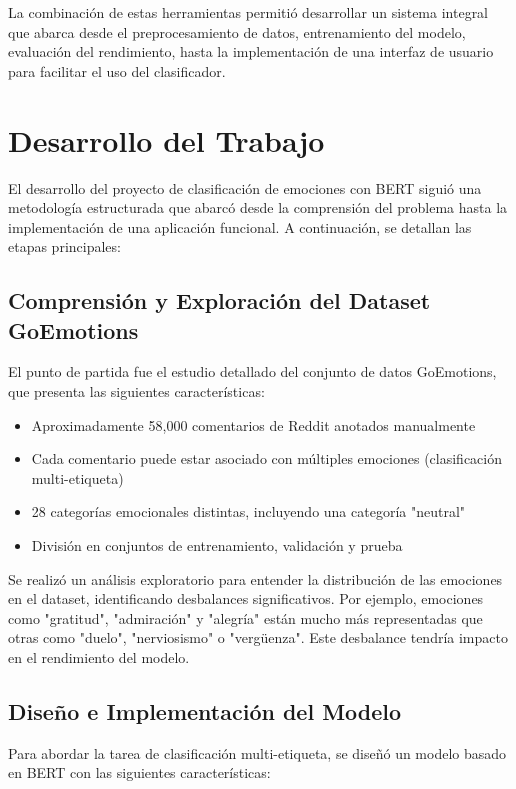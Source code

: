 \documentclass[12pt,a4paper]{report}
\begin{document}
La combinación de estas herramientas permitió desarrollar un sistema integral que abarca desde el preprocesamiento de datos, entrenamiento del modelo, evaluación del rendimiento, hasta la implementación de una interfaz de usuario para facilitar el uso del clasificador.

\section{Desarrollo del Trabajo}

El desarrollo del proyecto de clasificación de emociones con BERT siguió una metodología estructurada que abarcó desde la comprensión del problema hasta la implementación de una aplicación funcional. A continuación, se detallan las etapas principales:

\subsection{Comprensión y Exploración del Dataset GoEmotions}

El punto de partida fue el estudio detallado del conjunto de datos GoEmotions, que presenta las siguientes características:
\begin{itemize}
  \item Aproximadamente 58,000 comentarios de Reddit anotados manualmente
  \item Cada comentario puede estar asociado con múltiples emociones (clasificación multi-etiqueta)
  \item 28 categorías emocionales distintas, incluyendo una categoría "neutral"
  \item División en conjuntos de entrenamiento, validación y prueba
\end{itemize}

Se realizó un análisis exploratorio para entender la distribución de las emociones en el dataset, identificando desbalances significativos. Por ejemplo, emociones como "gratitud", "admiración" y "alegría" están mucho más representadas que otras como "duelo", "nerviosismo" o "vergüenza". Este desbalance tendría impacto en el rendimiento del modelo.

\subsection{Diseño e Implementación del Modelo}

Para abordar la tarea de clasificación multi-etiqueta, se diseñó un modelo basado en BERT con las siguientes características:
\end{document}
